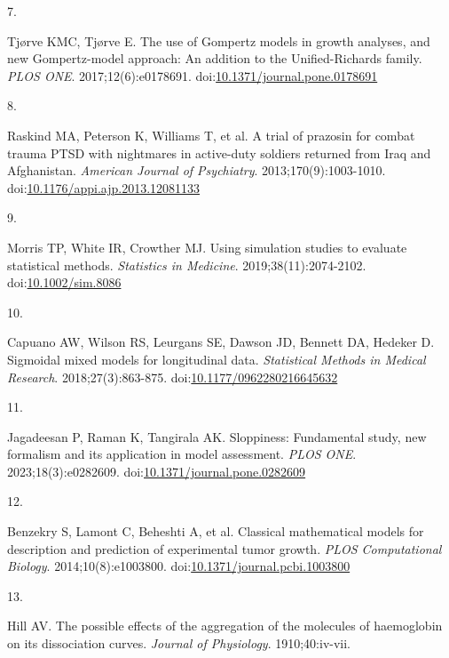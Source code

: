 \documentclass[
  11pt,
]{article}
\newlength{\cslhangindent}
\newlength{\csllabelwidth}
\newenvironment{CSLReferences}[2] %
 {\begin{list}{}{%
  \setlength{\itemindent}{0pt}
  \setlength{\leftmargin}{0pt}
  \setlength{\parsep}{0pt}
  \ifodd #1
   \setlength{\leftmargin}{\cslhangindent}
   \setlength{\itemindent}{-1\cslhangindent}
  \fi
  \setlength{\itemsep}{#2\baselineskip}}}
 {\end{list}}
\newcommand{\CSLLeftMargin}[1]{\parbox[t]{\csllabelwidth}{\strut#1\strut}}
\newcommand{\CSLRightInline}[1]{\parbox[t]{\linewidth - \csllabelwidth}{\strut#1\strut}}
\begin{document}
\begin{CSLReferences}{0}{1}
\CSLLeftMargin{7. }%
\CSLRightInline{Tjørve KMC, Tjørve E. The use of {G}ompertz models in growth analyses, and new {G}ompertz-model approach: An addition to the {U}nified-{R}ichards family. \emph{PLOS ONE}. 2017;12(6):e0178691. doi:\href{https://doi.org/10.1371/journal.pone.0178691}{10.1371/journal.pone.0178691}}

\CSLLeftMargin{8. }%
\CSLRightInline{{Raskind MA, Peterson K, Williams T, et al.} A trial of prazosin for combat trauma {PTSD} with nightmares in active-duty soldiers returned from {I}raq and {A}fghanistan. \emph{American Journal of Psychiatry}. 2013;170(9):1003-1010. doi:\href{https://doi.org/10.1176/appi.ajp.2013.12081133}{10.1176/appi.ajp.2013.12081133}}

\CSLLeftMargin{9. }%
\CSLRightInline{Morris TP, White IR, Crowther MJ. Using simulation studies to evaluate statistical methods. \emph{Statistics in Medicine}. 2019;38(11):2074-2102. doi:\href{https://doi.org/10.1002/sim.8086}{10.1002/sim.8086}}

\CSLLeftMargin{10. }%
\CSLRightInline{Capuano AW, Wilson RS, Leurgans SE, Dawson JD, Bennett DA, Hedeker D. Sigmoidal mixed models for longitudinal data. \emph{Statistical Methods in Medical Research}. 2018;27(3):863-875. doi:\href{https://doi.org/10.1177/0962280216645632}{10.1177/0962280216645632}}

\CSLLeftMargin{11. }%
\CSLRightInline{Jagadeesan P, Raman K, Tangirala AK. Sloppiness: Fundamental study, new formalism and its application in model assessment. \emph{PLOS ONE}. 2023;18(3):e0282609. doi:\href{https://doi.org/10.1371/journal.pone.0282609}{10.1371/journal.pone.0282609}}

\CSLLeftMargin{12. }%
\CSLRightInline{Benzekry S, Lamont C, Beheshti A, et al. Classical mathematical models for description and prediction of experimental tumor growth. \emph{PLOS Computational Biology}. 2014;10(8):e1003800. doi:\href{https://doi.org/10.1371/journal.pcbi.1003800}{10.1371/journal.pcbi.1003800}}

\CSLLeftMargin{13. }%
\CSLRightInline{Hill AV. The possible effects of the aggregation of the molecules of haemoglobin on its dissociation curves. \emph{Journal of Physiology}. 1910;40:iv-vii.}


\end{CSLReferences}
\end{document}
